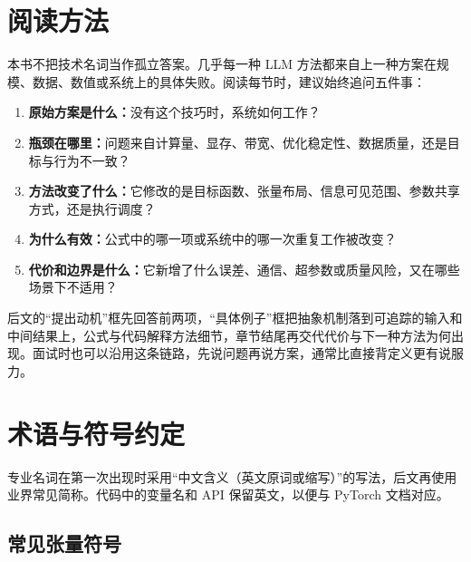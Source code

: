 \documentclass[UTF8,zihao=-4,openany,fontset=fandol]{ctexbook}
\begin{document}
\tableofcontents

\chapter*{阅读方法}

本书不把技术名词当作孤立答案。几乎每一种 LLM 方法都来自上一种方案在规模、数据、数值或系统上的具体失败。阅读每节时，建议始终追问五件事：

\begin{enumerate}
  \item \textbf{原始方案是什么：}没有这个技巧时，系统如何工作？
  \item \textbf{瓶颈在哪里：}问题来自计算量、显存、带宽、优化稳定性、数据质量，还是目标与行为不一致？
  \item \textbf{方法改变了什么：}它修改的是目标函数、张量布局、信息可见范围、参数共享方式，还是执行调度？
  \item \textbf{为什么有效：}公式中的哪一项或系统中的哪一次重复工作被改变？
  \item \textbf{代价和边界是什么：}它新增了什么误差、通信、超参数或质量风险，又在哪些场景下不适用？
\end{enumerate}

后文的“提出动机”框先回答前两项，“具体例子”框把抽象机制落到可追踪的输入和中间结果上，公式与代码解释方法细节，章节结尾再交代代价与下一种方法为何出现。面试时也可以沿用这条链路，先说问题再说方案，通常比直接背定义更有说服力。

\chapter*{术语与符号约定}

专业名词在第一次出现时采用“中文含义（英文原词或缩写）”的写法，后文再使用业界常见简称。代码中的变量名和 API 保留英文，以便与 PyTorch 文档对应。

\section*{常见张量符号}
\end{document}

